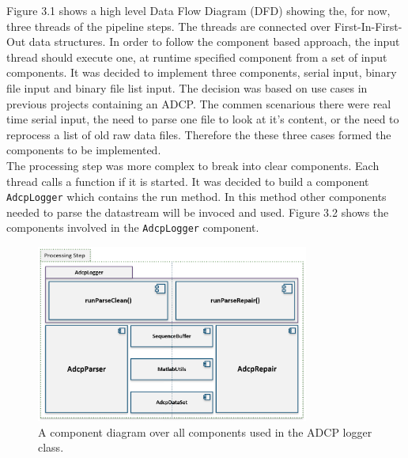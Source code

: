 Figure 3.1 shows a high level Data Flow Diagram (DFD) showing the, for now, three threads of the pipeline steps. The threads are connected over First-In-First-Out data structures. In order to follow the component based approach, the input thread should execute one, at runtime specified component from a set of input components. It was decided to implement three components, serial input, binary file input and binary file list input. The decision was based on use cases in previous projects containing an ADCP. The commen scenarious there were real time serial input, the need to parse one file to look at it's content, or the need to reprocess a list of old raw data files. Therefore the these three cases formed the components to be implemented.\\ 
The processing step was more complex to break into clear components. Each thread calls a function if it is started. It was decided to build a component \texttt{AdcpLogger} which contains the run method. In this method other components needed to parse the datastream will be invoced and used. Figure 3.2 shows the components involved in the \texttt{AdcpLogger} component. 
\begin{figure}[h]
\centering
      \includegraphics[width=0.8\textwidth]{components}
        \caption{A component diagram over all components used in the ADCP logger class.}
\end{figure}
